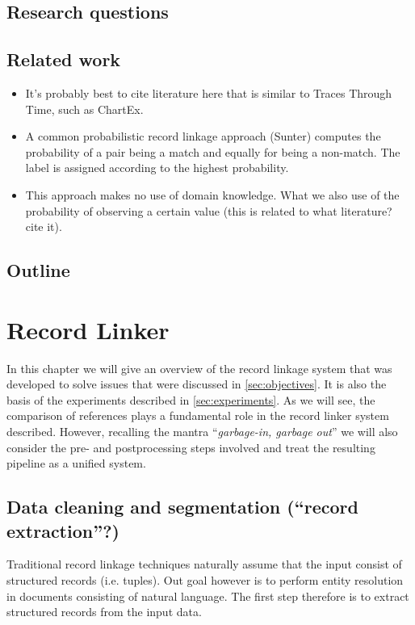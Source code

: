 \documentclass[paper=a4, fontsize=11pt]{scrartcl}
\begin{document}
\subsection{Research questions}
\label{sec:research_questions}

\subsection{Related work}
\label{sec:related_work}

\begin{itemize}
    \item It's probably best to cite literature here that is similar to Traces Through Time, such as ChartEx.
    \item A common probabilistic record linkage approach (Sunter) computes the probability of a pair being a match and equally for being a non-match. The label is assigned according to the highest probability.
    \item This approach makes no use of domain knowledge. What we also use of the probability of observing a certain value (this is related to what literature? cite it).
\end{itemize}

\subsection{Outline}
\label{sec:outline}



\section{Record Linker}
\label{sec:record_linker}
In this chapter we will give an overview of the record linkage system that was developed to solve issues that were discussed in \cref{sec:objectives}. It is also the basis of the experiments described in \cref{sec:experiments}.
As we will see, the comparison of references plays a fundamental role in the record linker system described.
However, recalling the mantra ``\emph{garbage-in, garbage out}'' we will also consider the pre- and postprocessing steps involved and treat the resulting pipeline as a unified system.

\subsection{Data cleaning and segmentation (``record extraction''?)}
\label{sec:segmentation}
Traditional record linkage techniques naturally assume that the input consist of structured records (i.e. tuples).
Out goal however is to perform entity resolution in documents consisting of natural language.
The first step therefore is to extract structured records from the input data.
\end{document}
